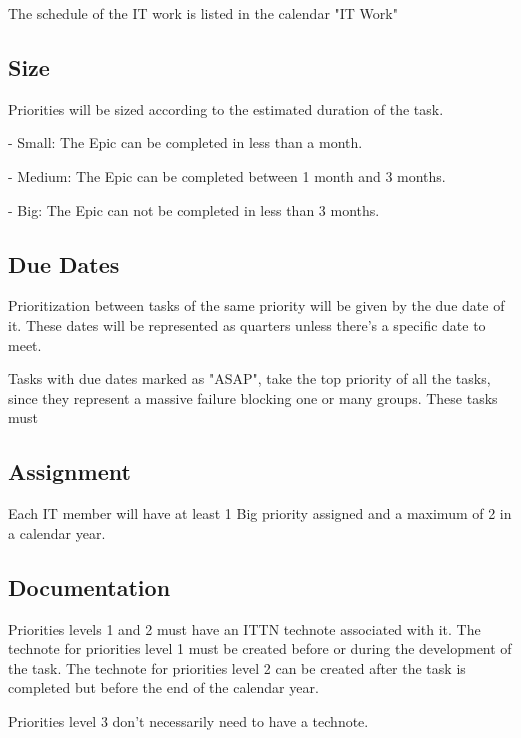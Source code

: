 The schedule of the IT work is listed in the calendar "IT Work"

\subsection{Size }

Priorities will be sized according to the estimated duration of the task.

  - Small: The Epic can be completed in less than a month.

  - Medium: The Epic can be completed between 1 month and 3 months.

  - Big: The Epic can not be completed in less than 3 months.

\subsection{Due Dates }

Prioritization between tasks of the same priority will be given by the due date of it. These dates will be represented as quarters unless there's a specific date to meet.

Tasks with due dates marked as "ASAP", take the top priority of all the tasks, since they represent a massive failure blocking one or many groups. These tasks must

\subsection{Assignment }

Each IT member will have at least 1 Big priority assigned and a maximum of 2 in a calendar year.

\subsection{Documentation }

Priorities levels 1 and 2 must have an ITTN technote associated with it. The technote for priorities level 1 must be created before or during the development of the task. The technote for priorities level 2 can be created after the task is completed but before the end of the calendar year.

Priorities level 3 don't necessarily need to have a technote.
